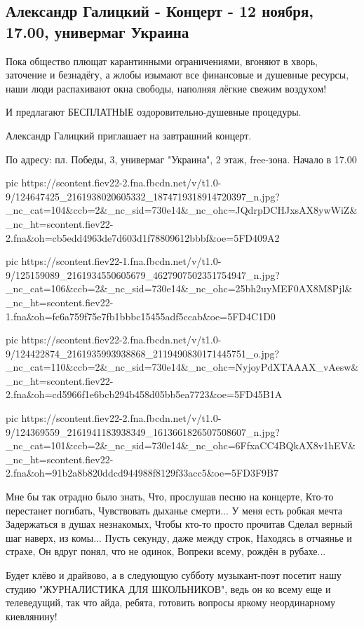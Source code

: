  
 
 

\subsection{Александр Галицкий - Концерт - 12 ноября, 17.00, универмаг Украина}

Пока общество плющат карантинными ограничениями, вгоняют в хворь, заточение и
безнадёгу, а жлобы изымают все финансовые и душевные ресурсы, наши люди
распахивают окна свободы, наполняя лёгкие свежим воздухом! 

И предлагают БЕСПЛАТНЫЕ оздоровительно-душевные процедуры. 

Александр Галицкий приглашает на завтрашний концерт. 

По адресу: пл. Победы, 3, универмаг "Украина", 2 этаж, free-зона. Начало в 17.00

\ifcmt
pic https://scontent.fiev22-2.fna.fbcdn.net/v/t1.0-9/124647425_2161938020605332_1874719318914720397_n.jpg?_nc_cat=104&ccb=2&_nc_sid=730e14&_nc_ohc=JQdrpDCHJxsAX8ywWiZ&_nc_ht=scontent.fiev22-2.fna&oh=cb5edd4963de7d603d1f78809612bbbf&oe=5FD409A2

pic https://scontent.fiev22-1.fna.fbcdn.net/v/t1.0-9/125159089_2161934550605679_4627907502351754947_n.jpg?_nc_cat=106&ccb=2&_nc_sid=730e14&_nc_ohc=25bh2uyMEF0AX8M8Pjl&_nc_ht=scontent.fiev22-1.fna&oh=fc6a759f75e7fb1bbbc15455adf5ccab&oe=5FD4C1D0

pic https://scontent.fiev22-2.fna.fbcdn.net/v/t1.0-9/124422874_2161935993938868_2119490830171445751_o.jpg?_nc_cat=110&ccb=2&_nc_sid=730e14&_nc_ohc=NyjoyPdXTAAAX_vAesw&_nc_ht=scontent.fiev22-2.fna&oh=cd5966f1e6bcb294b458d05bb5ea7723&oe=5FD45B1A

pic https://scontent.fiev22-2.fna.fbcdn.net/v/t1.0-9/124369559_2161941183938349_1613661826507508607_n.jpg?_nc_cat=101&ccb=2&_nc_sid=730e14&_nc_ohc=6FfxaCC4BQkAX8v1hEV&_nc_ht=scontent.fiev22-2.fna&oh=91b2a8b820ddcd944988f8129f33acc5&oe=5FD3F9B7
\fi

\obeycr
Мне бы так отрадно было знать,
Что, прослушав песню на концерте,
Кто-то перестанет погибать,
Чувствовать дыханье смерти...
У меня есть робкая мечта
Задержаться в душах незнакомых,
Чтобы кто-то просто прочитав
Сделал верный шаг наверх, из комы...
Пусть секунду, даже между строк,
Находясь в отчаянье и страхе,
Он вдруг понял, что не одинок,
Вопреки всему, рождён в рубахе...
\restorecr

Будет клёво и драйвово, а в следующую субботу музыкант-поэт посетит нашу студию
"ЖУРНАЛИСТИКА ДЛЯ ШКОЛЬНИКОВ", ведь он ко всему еще и телеведущий, так что
айда, ребята, готовить вопросы яркому неординарному киевлянину!
